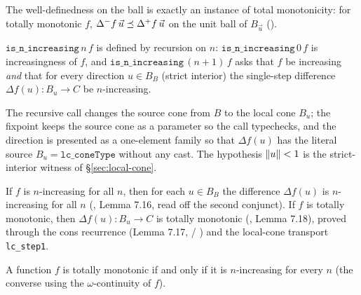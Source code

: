 The well-definedness on the ball is exactly an instance of total
monotonicity: for totally monotonic $f$,
$\Delta^- f\,\vec u \preceq \Delta^+ f\,\vec u$ on the unit ball of
$B_{\vec u}$ ().

\begin{definition}\label{def:n-increasing}
\rocqok{}
$\texttt{is\_n\_increasing}\,n\,f$ is defined by recursion on $n$:
$\texttt{is\_n\_increasing}\,0\,f$ is increasingness of $f$, and
$\texttt{is\_n\_increasing}\,(n+1)\,f$ asks that $f$ be increasing
\emph{and} that for every direction $u \in B_B$ (strict interior) the
single-step difference $\Delta f(u) : B_u \to C$ be $n$-increasing.
\end{definition}

The recursive call changes the source cone from $B$ to the local cone
$B_u$; the fixpoint keeps the source cone as a parameter so the call
typechecks, and the direction is presented as a one-element family so
that $\Delta f(u)$ has the literal source $B_u = \texttt{lc\_coneType}$
without any cast. The hypothesis $\lVert u \rVert < 1$ is the strict-interior
witness of \S\ref{sec:local-cone}.

\begin{lemma}[Lemmas 7.16, 7.18]\label{lem:716-718}
\rocqok{}
If $f$ is $n$-increasing for all $n$, then for each $u \in B_B$ the
difference $\Delta f(u)$ is $n$-increasing for all $n$
(, Lemma 7.16, read
off the second conjunct). If $f$ is totally monotonic, then $\Delta
f(u) : B_u \to C$ is totally monotonic
(, Lemma 7.18), proved
through the cons recurrence (Lemma 7.17,
 /
) and the local-cone
transport \texttt{lc\_step1}.
\end{lemma}

\begin{theorem}\label{thm:719}
\rocqok
{}\rocqok
{}
A function $f$ is totally monotonic if and only if it is $n$-increasing
for every $n$ (the converse using the $\omega$-continuity of $f$).
\end{theorem}

